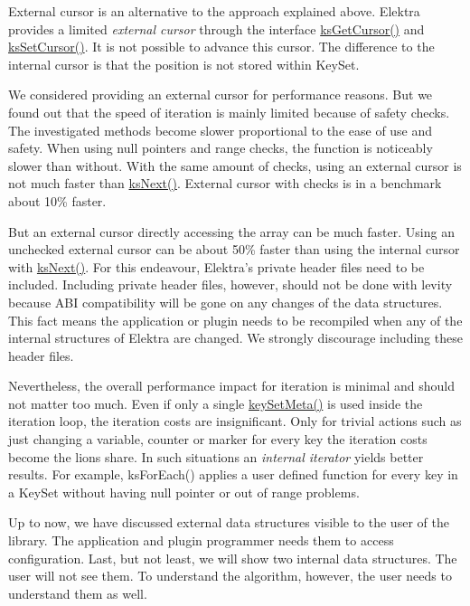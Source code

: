 External cursor is an alternative to the approach explained above. Elektra provides a limited {\itshape external cursor} through the interface {\ttfamily \hyperlink{group__keyset_gace0444eb8ec958a429794f8586fc72e7}{ks\+Get\+Cursor()}} and {\ttfamily \hyperlink{group__keyset_ga28b2a7d13c620b3c9d4815a0608c738f}{ks\+Set\+Cursor()}}. It is not possible to advance this cursor. The difference to the internal cursor is that the position is not stored within {\ttfamily Key\+Set}.

We considered providing an external cursor for performance reasons. But we found out that the speed of iteration is mainly limited because of safety checks. The investigated methods become slower proportional to the ease of use and safety. When using null pointers and range checks, the function is noticeably slower than without. With the same amount of checks, using an external cursor is not much faster than {\ttfamily \hyperlink{group__keyset_ga317321c9065b5a4b3e33fe1c399bcec9}{ks\+Next()}}. External cursor with checks is in a benchmark about 10\% faster.

But an external cursor directly accessing the array can be much faster. Using an unchecked external cursor can be about 50\% faster than using the internal cursor with \hyperlink{group__keyset_ga317321c9065b5a4b3e33fe1c399bcec9}{ks\+Next()}. For this endeavour, Elektra’s private header files need to be included. Including private header files, however, should not be done with levity because A\+BI compatibility will be gone on any changes of the data structures. This fact means the application or plugin needs to be recompiled when any of the internal structures of Elektra are changed. We strongly discourage including these header files.

Nevertheless, the overall performance impact for iteration is minimal and should not matter too much. Even if only a single {\ttfamily \hyperlink{group__keymeta_gae1f15546b234ffb6007d8a31178652b9}{key\+Set\+Meta()}} is used inside the iteration loop, the iteration costs are insignificant. Only for trivial actions such as just changing a variable, counter or marker for every key the iteration costs become the lion\textquotesingle{}s share. In such situations an {\itshape internal iterator} yields better results. For example, {\ttfamily ks\+For\+Each()} applies a user defined function for every key in a {\ttfamily Key\+Set} without having null pointer or out of range problems.

Up to now, we have discussed external data structures visible to the user of the library. The application and plugin programmer needs them to access configuration. Last, but not least, we will show two internal data structures. The user will not see them. To understand the algorithm, however, the user needs to understand them as well.

